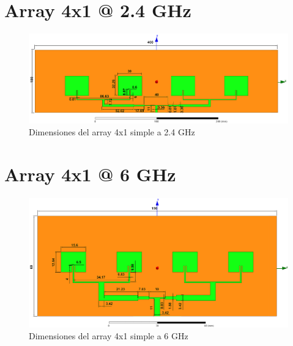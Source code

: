 \section{Array 4x1 @ 2.4 GHz}
\vfill
\begin{figure}[H]
   	 \centering
        \includegraphics[width=19cm ,height=\textheight, keepaspectratio=true, angle=90,origin=c]{archivos/desarrollo/autocad/5}
        \caption{Dimensiones del array 4x1 simple a 2.4 GHz}
        \label{fig:4x11}
\end{figure}
\vfill
\newpage

\section{Array 4x1 @ 6 GHz}
\vfill
\begin{figure}[H]
   	 \centering
        \includegraphics[width=19cm ,height=\textwidth, keepaspectratio=true, angle=90,origin=c]{archivos/desarrollo/autocad/6}
        \caption{Dimensiones del array 4x1 simple a 6 GHz}
        \label{fig:4x12}
\end{figure}
\vfill
\newpage

